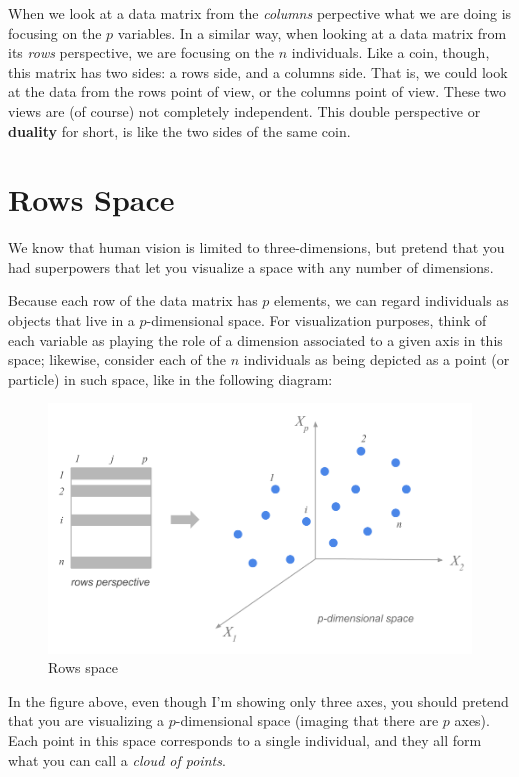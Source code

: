 \documentclass[]{book}
\begin{document}
When we look at a data matrix from the \emph{columns} perpective what we are doing is focusing on the \(p\) variables. In a similar way, when looking at a data matrix from its \emph{rows} perspective, we are focusing on the \(n\) individuals.
Like a coin, though, this matrix has two sides: a rows side, and a columns side.
That is, we could look at the data from the rows point of view, or the columns
point of view. These two views are (of course) not completely independent.
This double perspective or \textbf{duality} for short, is like the two sides of the
same coin.

\hypertarget{rows-space}{%
\section{Rows Space}\label{rows-space}}

We know that human vision is limited to three-dimensions, but pretend that you had superpowers that let you visualize a space with any number of dimensions.

Because each row of the data matrix has \(p\) elements, we can regard individuals as objects that live in a \(p\)-dimensional space. For visualization purposes, think of each variable as playing the role of a dimension associated to a given axis in this space; likewise, consider each of the \(n\) individuals as being depicted as a point (or particle) in such space, like in the following diagram:

\begin{figure}

{\centering \includegraphics[width=0.85\linewidth]{images/duality/rows-space} 

}

\caption{Rows space}\label{fig:unnamed-chunk-8}
\end{figure}

In the figure above, even though I'm showing only three axes, you should pretend that you are visualizing a \(p\)-dimensional space (imaging that there are \(p\) axes). Each point in this space corresponds to a single individual, and they all form what you can call a \emph{cloud of points}.
\end{document}
